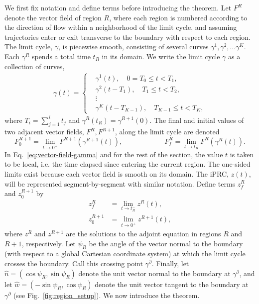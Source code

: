 \documentclass[12pt]{article}
\begin{document}
 We first fix notation and define terms before introducing the theorem.   Let $F^R$ denote the vector field of region $R$, where each region is numbered according to the direction of flow within a neighborhood of the limit cycle, and assuming trajectories enter or exit transverse to the boundary with respect to each region.  The limit cycle, $\gamma$, is piecewise smooth, consisting of several curves $\gamma^1, \gamma^2, ... \gamma^K$. Each $\gamma^R$ spends a total time $t_R$ in its domain.  We write the limit cycle $\gamma$ as a collection of curves,
\begin{eqnarray}\label{eq:gamma_pieces}
  \gamma(t) = \left\{
  \begin{aligned}
    &\gamma^1(t), \quad 0=T_0 \leq t < T_1,\\
    &\gamma^2(t-T_1), \quad T_1 \leq t < T_2,\\
    &\vdots\\
    &\gamma^K \left ( t - T_{K-1} \right ), \quad T_{K-1} \leq t < T_K,
  \end{aligned}
  \right.
\end{eqnarray}
 where $T_i = \sum_{j=1}^i t_j$ and $\gamma^R(t_R) = \gamma^{R+1}(0)$.  The final and initial values of two adjacent vector fields, $F^R,F^{R+1}$, along the limit cycle are denoted
\begin{equation}\label{eq:vector-field-gamma}
F^{R+1}_0= \lim_{t \rightarrow 0^+} F^{R+1}(\gamma^{R+1}(t)),\hspace{1in} 
F^R_f= \lim_{t \rightarrow t_R^-} F^R(\gamma^{R}(t)).
\end{equation}
In Eq.~\eqref{eq:vector-field-gamma} and for the rest of the section, the value $t$ is taken to be local, i.e. the time elapsed since entering the current region.  The one-sided limits exist because each vector field is smooth on its domain.  The iPRC, $z(t)$, will be represented segment-by-segment with similar notation.  Define terms $z_f^R$ and $z_0^{R+1}$ by
\begin{align}
 z_f^R&=\lim_{t\to t_R^-}z^R(t),\\
 z_0^{R+1}&=\lim_{t\to 0^+}z^{R+1}(t),
\end{align}
where $z^R$ and $z^{R+1}$ are the solutions to the adjoint equation in regions $R$ and $R+1$, respectively.  Let $\psi_R$ be the angle of the vector normal to the boundary (with respect to a global Cartesian coordinate system) at which the limit cycle crosses the boundary.  Call this crossing point $\gamma^\partial$.  Finally, let $\hat{n} = (\cos\psi_R, \sin\psi_R)$ denote the unit vector normal to the boundary at $\gamma^\partial$, and let $\hat{w} = (-\sin\psi_R,\cos\psi_R)$ denote the unit vector tangent to the boundary at $\gamma^\partial$ (see Fig.~\ref{fig:region_setup}).  We now introduce the theorem.
\end{document}
